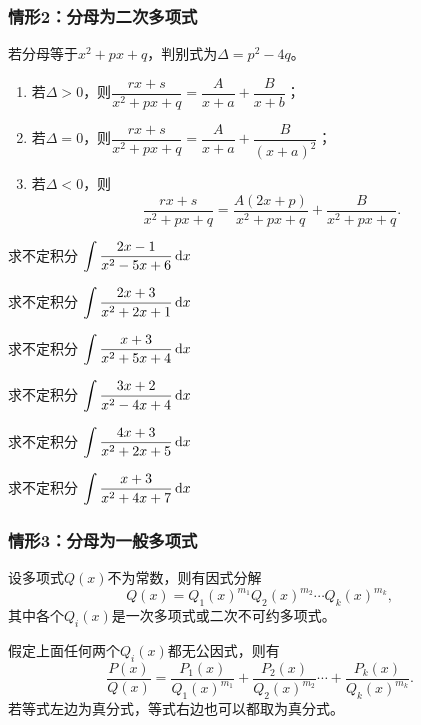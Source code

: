 \documentclass[14pt,notheorems,leqno,xcolor={rgb}]{beamer} %
\begin{document}
\begin{frame}
\frametitle{情形2：分母为二次多项式}
若分母等于$x^2+px+q$，判别式为$\Delta=p^2-4q$。\pause
\begin{enumerate}[<+->]
  \item 若$\Delta>0$，则$\dfrac{rx+s}{x^2+px+q}=\dfrac{A}{x+a}+\dfrac{B}{x+b}$；
  \item 若$\Delta=0$，则$\dfrac{rx+s}{x^2+px+q}=\dfrac{A}{x+a}+\dfrac{B}{(x+a)^2}$；
  \item 若$\Delta<0$，则$$\dfrac{rx+s}{x^2+px+q}=\dfrac{A(2x+p)}{x^2+px+q}+\dfrac{B}{x^2+px+q}.$$
\end{enumerate}
\end{frame}

\begin{frame}
\begin{example}求不定积分 $\Int\dfrac{2x-1}{x^2-5x+6}\d x$
\end{example}
\begin{example}求不定积分 $\Int\dfrac{2x+3}{x^2+2x+1}\d x$
\end{example}
\end{frame}

\begin{frame}
\begin{exercise}求不定积分 $\Int\dfrac{x+3}{x^2+5x+4}\d x$
\end{exercise}
\pause
\begin{exercise}求不定积分 $\Int\dfrac{3x+2}{x^2-4x+4}\d x$
\end{exercise}
\end{frame}

\begin{frame}
\begin{example}求不定积分 $\Int\dfrac{4x+3}{x^2+2x+5}\d x$
\end{example}
\end{frame}

\begin{frame}
\begin{exercise}求不定积分 $\Int\dfrac{x+3}{x^2+4x+7}\d x$
\end{exercise}
\end{frame}

\begin{iframe}
\frametitle{情形3：分母为一般多项式}
\begin{theorem}
设多项式$Q(x)$不为常数，则有因式分解
\[ Q(x)=Q_1(x)^{m_1}Q_2(x)^{m_2}\cdots Q_k(x)^{m_k}, \]
其中各个$Q_i(x)$是一次多项式或二次不可约多项式。
\end{theorem}
\vpause
\begin{theorem}
假定上面任何两个$Q_i(x)$都无公因式，则有
\[ \frac{P(x)}{Q(x)}=\frac{P_1(x)}{Q_1(x)^{m_1}}+\frac{P_2(x)}{Q_2(x)^{m_2}}
   \cdots +\frac{P_k(x)}{Q_k(x)^{m_k}}. \]
\pause
若等式左边为真分式，等式右边也可以都取为真分式。
\end{theorem}
\end{iframe}
\end{document}
